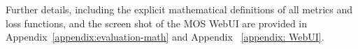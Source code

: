 \documentclass[final-report]{report-template}
\begin{document}
Further details, including the explicit mathematical definitions of all metrics and loss functions, and the screen shot of the MOS WebUI are provided in Appendix~\ref{appendix:evaluation-math} and Appendix ~\ref{appendix: WebUI}.





\end{document}
